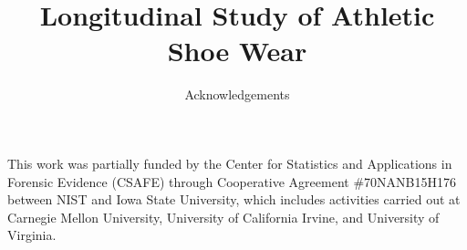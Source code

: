 \documentclass{article}
\author{Acknowledgements}
\title{Longitudinal Study of Athletic Shoe Wear}
\date{}
\begin{document}
\maketitle

This work was partially funded by the Center for Statistics and Applications in Forensic Evidence (CSAFE) through Cooperative Agreement \#70NANB15H176 between NIST and Iowa State University, which includes activities carried out at Carnegie Mellon University, University of California Irvine, and University of Virginia.
\end{document}
